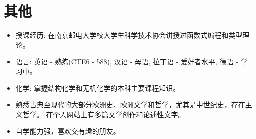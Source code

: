 \documentclass{resume}
\begin{document}
\section{其他}
\begin{itemize}[parsep=0.5ex]
  \item 授课经历: 在南京邮电大学校大学生科学技术协会讲授过函数式编程和类型理论。
  \item 语言: 英语 - 熟练(CTE6 - 588), 汉语 - 母语, 拉丁语 - 爱好者水平, 德语 - 学习中。
  \item 化学: 掌握结构化学和无机化学的本科主要课程知识。
  \item 熟悉古典至现代的大部分欧洲史、欧洲文学和哲学，尤其是中世纪史，存在主义哲学。
        在个人网站上有多篇文学创作和论述性文字。
  \item 自学能力强，喜欢交有趣的朋友。
\end{itemize}

%
%
\end{document}
